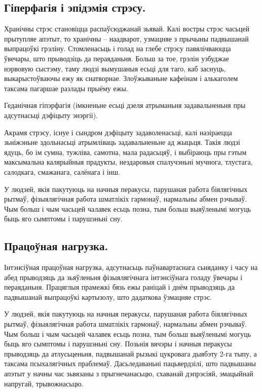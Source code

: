 \subsection{Гіперфагія і эпідэмія стрэсу.}
Хранічны стрэс становіцца распаўсюджанай зьявай. Калі востры стрэс часьцей прытупляе апэтыт, то хранічны – наадварот, узмацняе з прычыны падвышанай выпрацоўкі грэліну. Стомленасьць і голад на глебе стрэсу павялічваюцца ўвечары, што прыводзіць да пераяданьня. Больш за тое, грэлін узбуджае нэрвовую сыстэму, таму людзі вымушаныя есьці для таго, каб заснуць, выкарыстоўваючы ежу як снатворнае. Злоўжываньне кафеінам і алькаголем таксама пагаршае разлады прыёму ежы.

Геданічная гіпэрфагія (імкненьне есьці дзеля атрыманьня задавальненьня пры адсутнасьці дэфіцыту энэргіі).

Акрамя стрэсу, існуе і сындром дэфіцыту задаволенасьці, калі назіраецца зьніжэньне здольнасьці атрымліваць задавальненьне ад жыцьця. Такія людзі ядуць, бо ім сумна, тужліва, самотна, мала радасьцяў, і выбіраюць пры гэтым максымальна калярыйныя прадукты, нездаровыя спалучэньні мучнога, тлустага, салодкага, смажанага, салёнага і інш.

У людзей, якія пакутуюць на начныя перакусы, парушаная работа біялягічных рытмаў, фізыялягічная работа шматлікіх гармонаў, нармальны абмен рэчываў. Чым больш і чым часьцей чалавек есьць позна, тым больш выяўленымі могуць быць яго сымптомы і парушэньні сну.

\subsection{Працоўная нагрузка.}
Інтэнсіўная працоўная нагрузка, адсутнасьць паўнавартаснага сьняданку і часу на абед прыводзяць да зьяўленьня фізыялягічнага інтэнсіўнага голаду ўвечары і пераяданьня. Працяглыя прамежкі бязь ежы раніцай і днём прыводзяць да падвышанай выпрацоўкі картызолу, што дадаткова ўзмацняе стрэс.

У людзей, якія пакутуюць на начныя перакусы, парушаная работа біялягічных рытмаў, фізыялягічная работа шматлікіх гармонаў, нармальны абмен рэчываў. Чым больш і чым часьцей чалавек есьць позна, тым больш выяўленымі могуць быць яго сымптомы і парушэньні сну. Позьнія вячэры і начныя перакусы прыводзяць да атлусьценьня, падвышанай рызыкі цукровага дыябэту 2-га тыпу, а таксама псыхалягічных праблемаў. Дасьледаваньні пацьвердзілі, што падвышаны апэтыт у начны час зьвязаны з прыгнечанасьцю, схаванай дэпрэсіяй, эмацыйнай напругай, трывожнасьцю.


